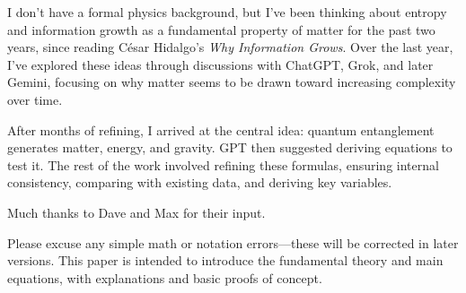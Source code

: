 \documentclass[11pt]{article}
\begin{document}
I don’t have a formal physics background, but I’ve been thinking about entropy and information growth as a fundamental property of matter for the past two years, since reading César Hidalgo’s \textit{Why Information Grows}. Over the last year, I’ve explored these ideas through discussions with ChatGPT, Grok, and later Gemini, focusing on why matter seems to be drawn toward increasing complexity over time.

After months of refining, I arrived at the central idea: quantum entanglement generates matter, energy, and gravity. GPT then suggested deriving equations to test it. The rest of the work involved refining these formulas, ensuring internal consistency, comparing with existing data, and deriving key variables.

Much thanks to Dave and Max for their input.

Please excuse any simple math or notation errors—these will be corrected in later versions. This paper is intended to introduce the fundamental theory and main equations, with explanations and basic proofs of concept.
\end{document}
